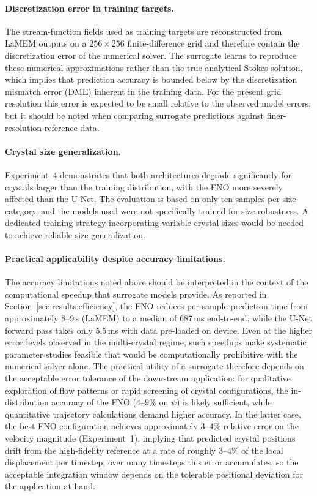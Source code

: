 \paragraph{Discretization error in training targets.} The stream-function fields used as training targets are reconstructed from LaMEM outputs on a $256\times256$ finite-difference grid and therefore contain the discretization error of the numerical solver. The surrogate learns to reproduce these numerical approximations rather than the true analytical Stokes solution, which implies that prediction accuracy is bounded below by the discretization mismatch error (DME) inherent in the training data. For the present grid resolution this error is expected to be small relative to the observed model errors, but it should be noted when comparing surrogate predictions against finer-resolution reference data.

\paragraph{Crystal size generalization.} Experiment~4 demonstrates that both architectures degrade significantly for crystals larger than the training distribution, with the FNO more severely affected than the U-Net. The evaluation is based on only ten samples per size category, and the models used were not specifically trained for size robustness. A dedicated training strategy incorporating variable crystal sizes would be needed to achieve reliable size generalization.

\paragraph{Practical applicability despite accuracy limitations.} The accuracy limitations noted above should be interpreted in the context of the computational speedup that surrogate models provide. As reported in Section~\ref{sec:results:efficiency}, the FNO reduces per-sample prediction time from approximately 8–9\,s (LaMEM) to a median of 687\,ms end-to-end, while the U-Net forward pass takes only 5.5\,ms with data pre-loaded on device. Even at the higher error levels observed in the multi-crystal regime, such speedups make systematic parameter studies feasible that would be computationally prohibitive with the numerical solver alone. The practical utility of a surrogate therefore depends on the acceptable error tolerance of the downstream application: for qualitative exploration of flow patterns or rapid screening of crystal configurations, the in-distribution accuracy of the FNO ($4$–$9\%$ on $\psi$) is likely sufficient, while quantitative trajectory calculations demand higher accuracy. In the latter case, the best FNO configuration achieves approximately $3$–$4\%$ relative error on the velocity magnitude (Experiment~1), implying that predicted crystal positions drift from the high-fidelity reference at a rate of roughly $3$–$4\%$ of the local displacement per timestep; over many timesteps this error accumulates, so the acceptable integration window depends on the tolerable positional deviation for the application at hand.

